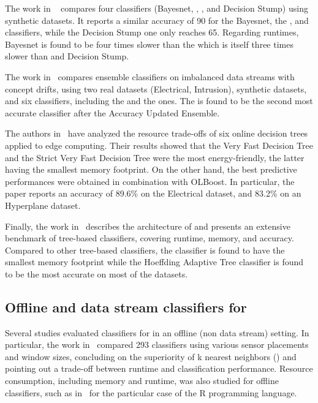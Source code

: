 The work in ~\cite{kaur2020} compares four classifiers (Bayesnet,
\hoeffdingtree, \naivebayes, and Decision Stump) using synthetic datasets.
It reports a similar accuracy of 90 for the Bayesnet, the
\hoeffdingtree, and \naivebayes classifiers, while the Decision Stump one
only reaches 65. Regarding runtimes, Bayesnet is found to be four times
slower than the \hoeffdingtree which is itself three times slower than
\naivebayes and Decision Stump.

The work in~\cite{priya2020comprehensive} compares ensemble classifiers on
imbalanced data streams with concept drifts, using two real datasets
(Electrical, Intrusion), synthetic datasets, and six classifiers, including the
\naivebayes and the \hoeffdingtree ones. The \hoeffdingtree is found to be
the second most accurate classifier after the Accuracy Updated Ensemble.

The authors in~\cite{lopes2020evaluating} have analyzed the resource trade-offs
of six online decision trees applied to edge computing. Their results showed that the
Very Fast Decision Tree and the Strict Very Fast Decision Tree were the most
energy-friendly, the latter having the smallest memory footprint. On the
other hand, the best predictive performances were obtained in combination with
OLBoost. In particular, the paper reports an accuracy of 89.6\% on the Electrical
dataset, and 83.2\% on an Hyperplane dataset.

Finally, the work in~\cite{StreamDM-CPP} describes the architecture of
\streamdmcpp and presents an extensive benchmark of tree-based classifiers,
covering runtime, memory, and accuracy. Compared to other tree-based
classifiers, the \hoeffdingtree classifier is found to have the smallest
memory footprint while the Hoeffding Adaptive Tree classifier is found to be
the most accurate on most of the datasets. 

\subsection{Offline and data stream classifiers for \har}

Several studies evaluated classifiers for \har in an offline (non data stream)
setting. In particular, the work in~\cite{Janidarmian_2017} compared 293
classifiers using various sensor placements and window sizes, concluding on the
superiority of k nearest neighbors (\knn) and pointing out a trade-off between
runtime and classification performance. Resource consumption, including memory
and runtime, was also studied for offline classifiers, such as
in~\cite{memory_consumption_machine_learning} for the particular case of the R
programming language.

